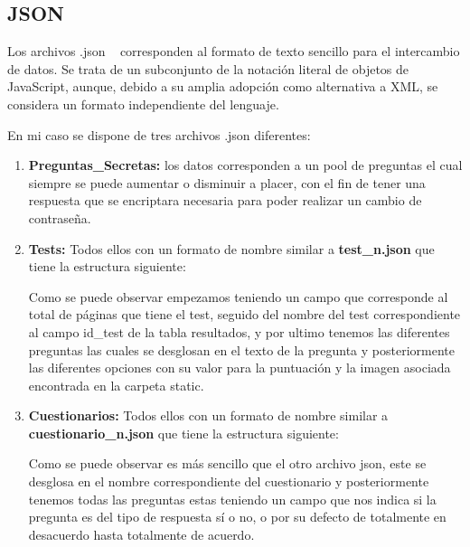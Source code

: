 
\subsection{JSON}
Los archivos .json ~\cite{wiki:JSON} corresponden al formato de texto sencillo para el intercambio de datos. Se trata de un subconjunto de la notación literal de objetos de JavaScript, aunque, debido a su amplia adopción como alternativa a XML, se considera un formato independiente del lenguaje. 

En mi caso se dispone de tres archivos .json diferentes:
\begin{enumerate}
    \item \textbf{Preguntas\_Secretas:} los datos corresponden a un pool de preguntas el cual siempre se puede aumentar o disminuir a placer, con el fin de tener una respuesta que se encriptara necesaria para poder realizar un cambio de contraseña.
    \item \textbf{Tests:} Todos ellos con un formato de nombre similar a \textbf{test\_n.json} que tiene la estructura siguiente:
    
    Como se puede observar empezamos teniendo un campo que corresponde al total de páginas que tiene el test, seguido del nombre del test correspondiente al campo id\_test de la tabla resultados, y por ultimo tenemos las diferentes preguntas las cuales se desglosan en el texto de la pregunta y posteriormente las diferentes opciones con su valor para la puntuación y la imagen asociada encontrada en la carpeta static.
    \item \textbf{Cuestionarios:} Todos ellos con un formato de nombre similar a \textbf{cuestionario\_n.json} que tiene la estructura siguiente:
    
    Como se puede observar es más sencillo que el otro archivo json, este se desglosa en el nombre correspondiente del cuestionario y posteriormente tenemos todas las preguntas estas teniendo un campo que nos indica si la pregunta es del tipo de respuesta sí o no, o por su defecto de totalmente en desacuerdo hasta totalmente de acuerdo.

\end{enumerate}
